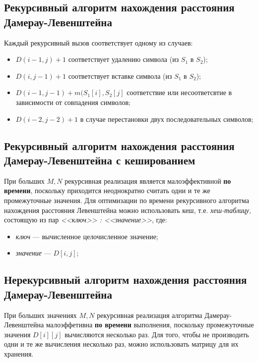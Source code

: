 \subsection{Рекурсивный алгоритм нахождения расстояния Дамерау-Левенштейна}

Каждый рекурсивный вызов соответствует одному из случаев:
\begin{itemize}
    \item $D(i - 1, j) + 1$ соответствует удалению символа (из $S_{1}$ в $S_{2}$);
    \item $D(i, j - 1) + 1$ соответствует вставке символа (из $S_{1}$ в $S_{2}$);
    \item $D(i - 1, j - 1) + m(S_{1}[i], S_{2}[j]$ соответствие или несоответсвтие в зависимости от совпадения символов;
    \item $D(i - 2, j - 2) + 1$ в случае перестановки двух последовательных символов;
\end{itemize}

\subsection{Рекурсивный алгоритм нахождения расстояния Дамерау-Левенштейна с кешированием}

При больших $M, N$ рекурсивная реализация является малоэффективной \textbf{по времени}, поскольку приходится неоднократно считать одни и те же промежуточные значения. Для оптимизации по времени рекурсивного алгоритма нахождения расстояния Левенштейна можно использовать кеш, т.е. \textit{хеш-таблицу}, состоящую из пар \textit{<<ключ>> : <<значение>>}, где:
\begin{itemize}
    \item \textit{ключ} --- вычисленное целочисленное значение;
    \item \textit{значение} --- $D[i, j]$;
\end{itemize}

\subsection{Нерекурсивный алгоритм нахождения расстояния Дамерау-Левенштейна}

При больших значениях $M, N$ рекурсивная реализация алгоритма Дамерау-Левенштейна малоэффетивна \textbf{по времени} выполнения, поскольку промежуточные значения $D[i][j]$ вычисляются несколько раз. Для того, чтобы не производить одни и те же вычисления несколько раз, можно использовать матрицу для их хранения.

